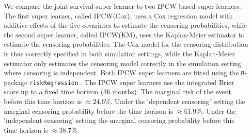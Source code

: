 \documentclass[alpha-refs]{wiley-article}
\newcommand{\1}{\mathbb{1}} %
\begin{document}
We compare the joint survival super learner to two IPCW based super
learners: The first super learner, called IPCW(Cox), uses a Cox
regression model with additive effects of the five covariates to
estimate the censoring probabilities, while the second super learner,
called IPCW(KM), uses the Kaplan-Meier estimator to estimate the
censoring probabilities. The Cox model for the censoring distribution
is thus correctly specified in both simulation settings, while the
Kaplan-Meier estimator only estimates the censoring model correctly in
the simulation setting where censoring is independent. Both IPCW super
learners are fitted using the \texttt{R}-package
\texttt{riskRegression} \citep{Gerds_Ohlendorff_Ozenne_2023}.
%
%
The IPCW super learners use the integrated Brier score up to a fixed time
horizon (36 months). The marginal risk of the event before this time horizon is
\(\approx 24.6\)\%. Under the `dependent censoring' setting the marginal
censoring probability before the time horizon is \(\approx 61.9\)\%. Under the
`independent censoring' setting the marginal censoring probability before this
time horizon is \( \approx 38.7 \)\%.
\end{document}
